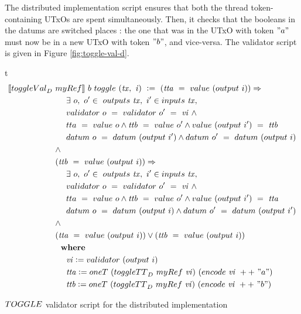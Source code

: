 The distributed implementation script ensures that both the thread token-containing
UTxOs are spent simultaneously. Then, it checks that the booleans in the datums are switched places :
the one that was in the UTxO with token $"a"$ must now be in a new UTxO with
token $"b"$, and vice-versa. The validator script is given in Figure \ref{fig:toggle-val-d}.
\begin{ruledfigure}{t}
  \begin{align*}
    \applyScript{\toggleVal_D~&\mathsf{myRef}}~b~\toggle~(\var{tx},~\var{i})~\leteq ~
    (\var{tta}~ =~ \val~(\fun{output}~i)) \Rightarrow \\
    & ~~~~\exists~o,~o'\in~\outputs~\var{tx},~i' \in \fun{inputs}~\var{tx}, \\
    & ~~~~ \validator~o~=~\validator~o'~=~\var{vi}~\wedge~\\
    & ~~~~ \mathsf{tta}~ =~ \val~o \wedge \var{ttb}~ =~ \val~o' \wedge \val~(\fun{output}~i')~=~\var{ttb} \\
    & ~~~~ \datum~o~=~\datum~ (\fun{output}~i') \wedge \datum~o'~=~\datum~ (\fun{output}~i) \\
    & \wedge \\
    & (\var{ttb}~ =~ \val~(\fun{output}~i)) \Rightarrow \\
    & ~~~~\exists~o,~o'\in~\outputs~\var{tx},~i' \in \fun{inputs}~\var{tx}, \\
    & ~~~~ \validator~o~=~\validator~o'~=~\var{vi}~\wedge~\\
    & ~~~~ \mathsf{tta}~ =~ \val~o \wedge \var{ttb}~ =~ \val~o' \wedge \val~(\fun{output}~i')~=~\var{tta} \\
    & ~~~~ \datum~o~=~\datum~ (\fun{output}~i) \wedge \datum~o'~=~\datum~ (\fun{output}~i') \\
    & \wedge \\
    & (\var{tta}~ =~ \val~(\fun{output}~i)) \vee (\var{ttb}~ =~ \val~(\fun{output}~i)) \\
    & \where \\
    & ~~~~\var{vi} \leteq \validator~(\fun{output}~i) \\
    & ~~~~\var{tta} \leteq \mathsf{oneT}~(\toggleTT_D~\mathsf{myRef}~\var{vi})~(\fun{encode}~\var{vi}~++~ "a") \\
    & ~~~~\var{ttb} \leteq \mathsf{oneT}~(\toggleTT_D~\mathsf{myRef}~\var{vi})~(\fun{encode}~\var{vi}~++~"b")
  \end{align*}
\caption{$\TOGGLE$ validator script for the distributed implementation}
\label{fig:toggle-val-d}
\end{ruledfigure}

